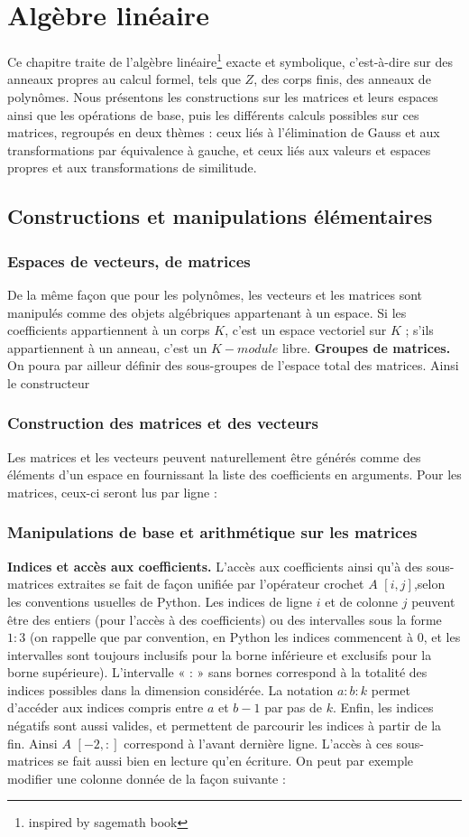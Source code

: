 \chapter{Algèbre linéaire}
Ce chapitre traite de l’algèbre linéaire\footnote{inspired by sagemath book} exacte et symbolique, c’est-à-dire sur
des anneaux propres au calcul formel, tels que $Z$, des corps finis, des anneaux de
polynômes. Nous présentons les constructions sur les matrices et leurs espaces ainsi que les
opérations de base, puis les différents calculs possibles sur ces matrices, regroupés en deux thèmes : ceux liés à l’élimination de Gauss et aux transformations par équivalence à gauche, et ceux liés aux valeurs et espaces
propres et aux transformations de similitude.
\section{Constructions et manipulations élémentaires}
\subsection{ Espaces de vecteurs, de matrices}
De la même façon que pour les polynômes, les vecteurs et les matrices sont
manipulés comme des objets algébriques appartenant à un espace. Si les coefficients
appartiennent à un corps $K$, c’est un espace vectoriel sur $K$ ; s’ils appartiennent
à un anneau, c’est un $K-module$ libre.
\textbf{Groupes de matrices.} On poura par ailleur définir des sous-groupes de l'espace total des matrices. Ainsi le constructeur 
\subsection{ Construction des matrices et des vecteurs}
Les matrices et les vecteurs peuvent naturellement être générés comme des éléments d’un espace en fournissant la liste des coefficients en arguments. Pour les matrices, ceux-ci seront lus par ligne :
\subsection{ Manipulations de base et arithmétique sur les matrices}
\textbf{Indices et accès aux coefficients.} L'accès aux coefficients ainsi qu’à des
sous-matrices extraites se fait de façon unifiée par l’opérateur crochet $A$ $\left[i, j\right]$,selon les 
conventions usuelles de Python. Les indices de ligne $i$ et de colonne $j$ peuvent être des entiers (pour 
l’accès à des coefficients) ou des intervalles sous la forme $1:3$ (on rappelle que par convention, en Python 
les indices commencent à $0$, et les intervalles sont toujours inclusifs pour la borne inférieure et exclusifs 
pour la borne supérieure). L’intervalle « : » sans bornes correspond à la totalité des indices possibles dans la 
dimension considérée. La notation $a:b:k$ permet d’accéder aux indices compris entre $a$ et $b-1$ par pas de 
$k$. Enfin, les indices négatifs sont aussi valides, et permettent de parcourir les indices à partir de la
fin. Ainsi $A$ $\left[-2,:\right]$ correspond à l’avant dernière ligne. L'accès à ces sous-matrices
se fait aussi bien en lecture qu’en écriture. On peut par exemple modifier une colonne donnée de la façon 
suivante :
